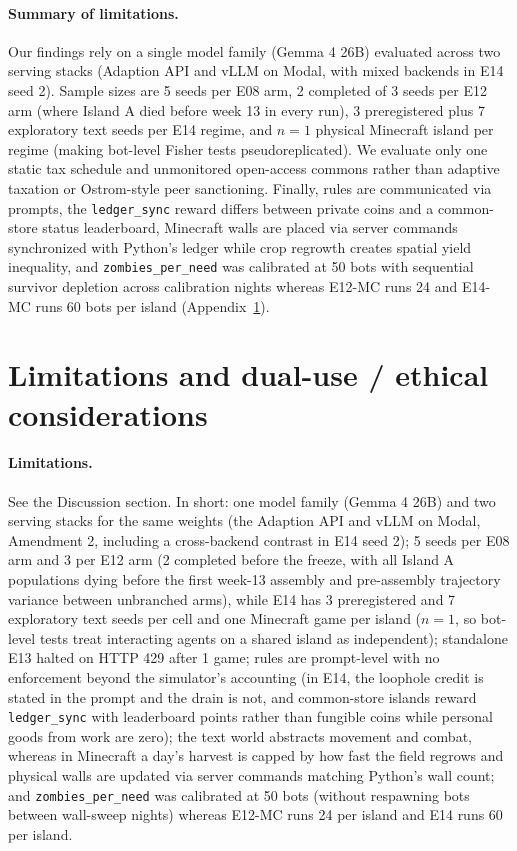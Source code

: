 \documentclass[10pt,letterpaper]{article}
\begin{document}
\paragraph{Summary of limitations.}
Our findings rely on a single model family (Gemma 4 26B) evaluated across two serving stacks (Adaption API and vLLM on Modal, with mixed backends in E14 seed 2). Sample sizes are 5 seeds per E08 arm, 2 completed of 3 seeds per E12 arm (where Island A died before week 13 in every run), 3 preregistered plus 7 exploratory text seeds per E14 regime, and $n = 1$ physical Minecraft island per regime (making bot-level Fisher tests pseudoreplicated). We evaluate only one static tax schedule and unmonitored open-access commons rather than adaptive taxation or Ostrom-style peer sanctioning. Finally, rules are communicated via prompts, the \texttt{ledger\_sync} reward differs between private coins and a common-store status leaderboard, Minecraft walls are placed via server commands synchronized with Python's ledger while crop regrowth creates spatial yield inequality, and \texttt{zombies\_per\_need} was calibrated at 50 bots with sequential survivor depletion across calibration nights whereas E12-MC runs 24 and E14-MC runs 60 bots per island (Appendix~\ref{sec:appendix_lim}).

\appendix

\section{Limitations and dual-use / ethical considerations}\label{sec:appendix_lim}

\paragraph{Limitations.}
See the Discussion section. In short: one model family (Gemma 4 26B) and two serving stacks for the same weights (the Adaption API and vLLM on Modal, Amendment 2, including a cross-backend contrast in E14 seed 2); 5 seeds per E08 arm and 3 per E12 arm (2 completed before the freeze, with all Island A populations dying before the first week-13 assembly and pre-assembly trajectory variance between unbranched arms), while E14 has 3 preregistered and 7 exploratory text seeds per cell and one Minecraft game per island ($n=1$, so bot-level tests treat interacting agents on a shared island as independent); standalone E13 halted on HTTP 429 after 1 game; rules are prompt-level with no enforcement beyond the simulator's accounting (in E14, the loophole credit is stated in the prompt and the drain is not, and common-store islands reward \texttt{ledger\_sync} with leaderboard points rather than fungible coins while personal goods from work are zero); the text world abstracts movement and combat, whereas in Minecraft a day's harvest is capped by how fast the field regrows and physical walls are updated via server commands matching Python's wall count; and \texttt{zombies\_per\_need} was calibrated at 50 bots (without respawning bots between wall-sweep nights) whereas E12-MC runs 24 per island and E14 runs 60 per island.
\end{document}
